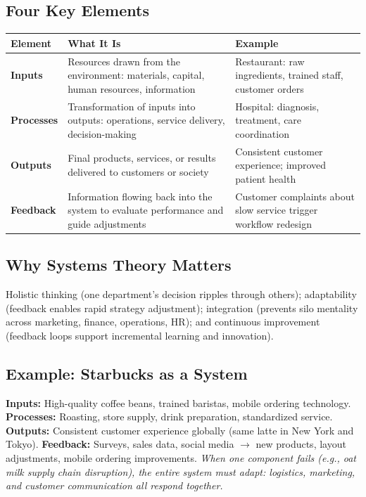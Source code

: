 \documentclass[11pt, letterpaper]{article}
\begin{document}
\subsection{Four Key Elements}

\begin{center}
\begin{tabular}{>{\bfseries}p{2.5cm} p{5cm} p{5cm}}
\toprule
Element & What It Is & Example \\
\midrule
Inputs & Resources drawn from the environment: materials, capital, human resources, information & Restaurant: raw ingredients, trained staff, customer orders \\
\addlinespace
Processes & Transformation of inputs into outputs: operations, service delivery, decision-making & Hospital: diagnosis, treatment, care coordination \\
\addlinespace
Outputs & Final products, services, or results delivered to customers or society & Consistent customer experience; improved patient health \\
\addlinespace
Feedback & Information flowing back into the system to evaluate performance and guide adjustments & Customer complaints about slow service trigger workflow redesign \\
\bottomrule
\end{tabular}
\end{center}

\subsection{Why Systems Theory Matters}

Holistic thinking (one department's decision ripples through others); adaptability (feedback enables rapid strategy adjustment); integration (prevents silo mentality across marketing, finance, operations, HR); and continuous improvement (feedback loops support incremental learning and innovation).

\subsection{Example: Starbucks as a System}

\textbf{Inputs:} High-quality coffee beans, trained baristas, mobile ordering technology. \textbf{Processes:} Roasting, store supply, drink preparation, standardized service. \textbf{Outputs:} Consistent customer experience globally (same latte in New York and Tokyo). \textbf{Feedback:} Surveys, sales data, social media $\rightarrow$ new products, layout adjustments, mobile ordering improvements. \textit{When one component fails (e.g., oat milk supply chain disruption), the entire system must adapt: logistics, marketing, and customer communication all respond together.}
\end{document}
